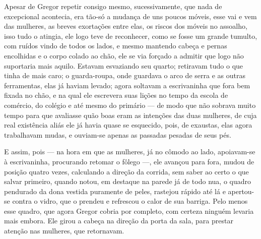 Apesar de Gregor repetir consigo mesmo, sucessivamente, que nada de
excepcional acontecia, era tão-só a mudança de uns poucos móveis, esse vai
e vem das mulheres, as breves exortações entre elas, os riscos dos móveis
no assoalho, isso tudo o atingia, ele logo teve de reconhecer, como se
fosse um grande tumulto, com ruídos vindo de todos os lados, e mesmo
mantendo cabeça e pernas encolhidas e o corpo colado ao chão, ele se via
forçado a admitir que logo não suportaria mais aquilo. Estavam esvaziando
seu quarto; retiravam tudo o que tinha de mais caro; o guarda-roupa, onde
guardava o arco de serra e as outras ferramentas, elas já haviam levado;
agora soltavam a escrivaninha que fora bem fixada no chão, e na qual ele
escrevera suas lições no tempo da escola de comércio, do colégio e até
mesmo do primário --- de modo que não sobrava muito tempo para que avaliasse
quão boas eram as intenções das duas mulheres, de cuja real existência
aliás ele já havia quase se esquecido, pois, de exaustas, elas agora
trabalhavam mudas, e ouviam-se apenas as passadas pesadas de seus pés.

E assim, pois --- na hora em que as mulheres, já no cômodo ao lado,
apoiavam-se à escrivaninha, procurando retomar o fôlego ---, ele avançou
para fora, mudou de posição quatro vezes, calculando a direção da corrida,
sem saber ao certo o que salvar primeiro, quando notou, em destaque na
parede já de todo nua, o quadro pendurado da dona vestida puramente de
peles, rastejou rápido até lá e apertou-se contra o vidro, que o prendeu e
refrescou o calor de sua barriga. Pelo menos esse quadro, que agora Gregor
cobria por completo, com certeza ninguém levaria mais embora. Ele girou a
cabeça na direção da porta da sala, para prestar atenção nas mulheres, que
retornavam.


